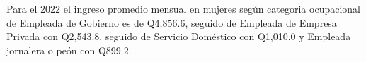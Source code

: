 Para el 2022 el ingreso promedio mensual en mujeres según categoria ocupacional de Empleada de Gobierno es de Q4,856.6, seguido de Empleada de Empresa Privada con Q2,543.8, seguido de Servicio Doméstico con Q1,010.0 y Empleada jornalera o peón con Q899.2.